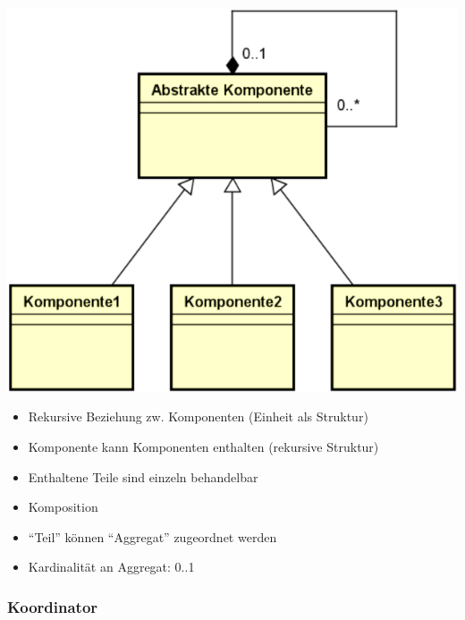 \documentclass[11pt, a4paper]{article}
\begin{document}
\begin{minipage}[h]{0.25\textwidth}
    \centering \includegraphics[width=1\textwidth]{Analysemuster-03.png} 
\end{minipage}
\begin{minipage}[h]{0.7\textwidth}
    \raggedleft
    \begin{itemize}
        \item Rekursive Beziehung zw. Komponenten (Einheit als Struktur)
        \item Komponente kann Komponenten enthalten (rekursive Struktur)
        \item Enthaltene Teile sind einzeln behandelbar
    \end{itemize}
    \vspace{1em}
    \begin{itemize}
        \item Komposition
        \item “Teil” können “Aggregat” zugeordnet werden
        \item Kardinalität an Aggregat: 0..1
    \end{itemize}
\end{minipage}



\subsubsection*{Koordinator}
\end{document}
